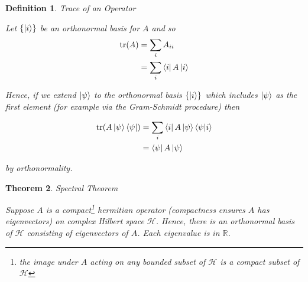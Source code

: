 \documentclass[11pt]{article}
\newcommand\0{\mathbf{0}}
\newcommand\RR{\mathbb{R}}
\newcommand\<{\langle}
\renewcommand\>{\rangle}
\newtheorem{theorem}{Theorem}[section]
\newtheorem{definition}[theorem]{Definition}
\begin{document}
\begin{appendices}
\begin{definition}
\label{trop}
Trace of an Operator

Let $\{\ket{i}\}$ be an orthonormal basis for $A$ and so
\begin{align*}
\tr(A) &= \sum_i A_{ii} \\
&= \sum_i \bra{i} A \ket{i}	
\end{align*}

Hence, if we extend $\ket{\psi}$ to the orthonormal basis $\{\ket{i}\}$ which includes $\ket{\psi}$ as the first element (for example via the Gram-Schmidt procedure) then

\begin{align*}
	\tr(A\ket{\psi}\bra{\psi}) &= \sum_i \bra{i} A\ket{\psi}\bra{\psi}\ket{i}	 \\
	&= \bra{\psi} A\ket{\psi}
\end{align*}

by orthonormality.
\end{definition}

\begin{theorem}Spectral Theorem
\label{thm:spec}

Suppose $A$ is a compact\footnote{the image under $A$ acting on any bounded subset of $\mathcal{H}$ is a compact subset of $\mathcal{H}$} hermitian operator (compactness ensures $A$ has eigenvectors) on complex Hilbert space $\mathcal{H}$. Hence, there is an orthonormal basis of $\mathcal{H}$ consisting of eigenvectors of $A$. Each eigenvalue is in $\RR$.	
\end{theorem}
\end{appendices}

\nocite{*}
\printbibliography
\end{document}
